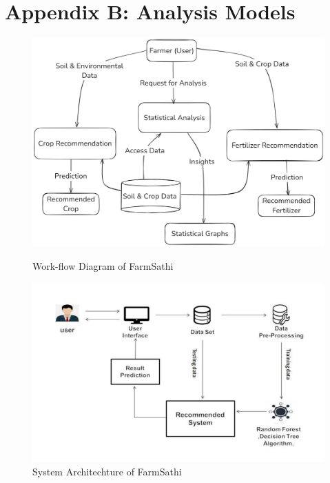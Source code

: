 \documentclass{scrreprt}
\begin{document}
\chapter{Appendix B: Analysis Models}
\begin{figure}[h!]
    \centering
    \includegraphics[width=0.6\linewidth]{Entire_Flow_Diagram.png}
    \caption{Work-flow Diagram of FarmSathi}
    \label{fig:FarmSathi_Workflow}
    
    \vspace{1cm}

    \centering
    \includegraphics[width=0.8\linewidth]{System Architecture.png}
    \caption{System Architechture of FarmSathi}
    \label{fig:FarmSathi_Sysytem_Architecture}
\end{figure}
\end{document}
